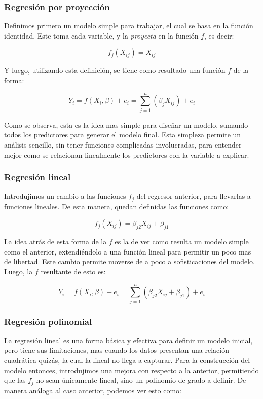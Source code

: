     \subsubsection{Regresión por proyección}
        
        Definimos primero un modelo simple para trabajar, el cual se basa en la función identidad. Este toma cada variable, y la \textit{proyecta} en la función $f$, es decir:
        
        \[f_j(X_{ij}) = X_{ij}\]
         
        Y luego, utilizando esta definición, se tiene como resultado una función $f$ de la forma:
        
         \[ 
        Y_i 
        = f(X_i,\beta) + e_i 
        = \sum_{j=1}^{n} (\beta_{j} {X_{ij}})  + e_i\]
        
        Como se observa, esta es la idea mas simple para diseñar un modelo, sumando todos los predictores para generar el modelo final. Esta simpleza permite un análisis sencillo, sin tener funciones complicadas involucradas, para entender mejor como se relacionan linealmente los predictores con la variable a explicar.
    \subsubsection{Regresión lineal}
        
        Introdujimos un cambio a las funciones $f_j$ del regresor anterior, para llevarlas a funciones lineales. De esta manera, quedan definidas las funciones como:
        
        \[f_j(X_{ij}) = \beta_{j2} {X_{ij}} + \beta_{j1}\]
        
        La idea atrás de esta forma de la $f$ es la de ver como resulta un modelo simple como el anterior, extendiéndolo a una función lineal para permitir un poco mas de libertad. Este cambio permite moverse de a poco a sofisticaciones del modelo. Luego, la $f$ resultante de esto es:
        
         \[ 
        Y_i 
        = f(X_i,\beta) + e_i 
        = \sum_{j=1}^{n} (\beta_{j2} {X_{ij}} + \beta_{j1})  + e_i\]
        
    \subsubsection{Regresión polinomial}
        
        La regresión lineal es una forma básica y efectiva para definir un modelo inicial, pero tiene sus limitaciones, mas cuando los datos presentan una relación cuadrática quizás, la cual la lineal no llega a capturar. Para la construcción del modelo entonces, introdujimos una mejora con respecto a la anterior, permitiendo que las $f_j$ no sean únicamente lineal, sino un polinomio de grado a definir. De manera análoga al caso anterior, podemos ver esto como:
        
